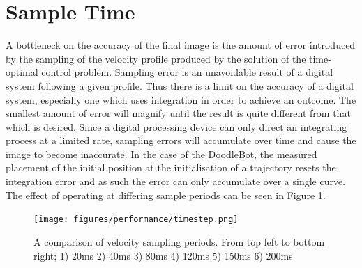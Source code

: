 \section{Sample Time}
A bottleneck on the accuracy of the final image is the amount of error introduced by the sampling of the velocity profile produced by the solution of the time-optimal control problem. Sampling error is an unavoidable result of a digital system following a given profile. Thus there is a limit on the accuracy of a digital system, especially one which uses integration in order to achieve an outcome. The smallest amount of error will magnify until the result is quite different from that which is desired. Since a digital processing device can only direct an integrating process at a limited rate, sampling errors will accumulate over time and cause the image to become inaccurate. In the case of the DoodleBot, the measured placement of the initial position at the initialisation of a trajectory resets the integration error and as such the error can only accumulate over a single curve. The effect of operating at differing sample periods can be seen in Figure \ref{fig:timestep}.

\begin{figure}[htbp]  
\texttt{[image: figures/performance/timestep.png]}
\caption[Comparison of differing velocity sampling frequencies]{A comparison of velocity sampling periods. From top left to bottom right; 1) 20ms 2) 40ms 3) 80ms 4) 120ms 5) 150ms 6) 200ms
\label{fig:timestep}}
\end{figure}  

